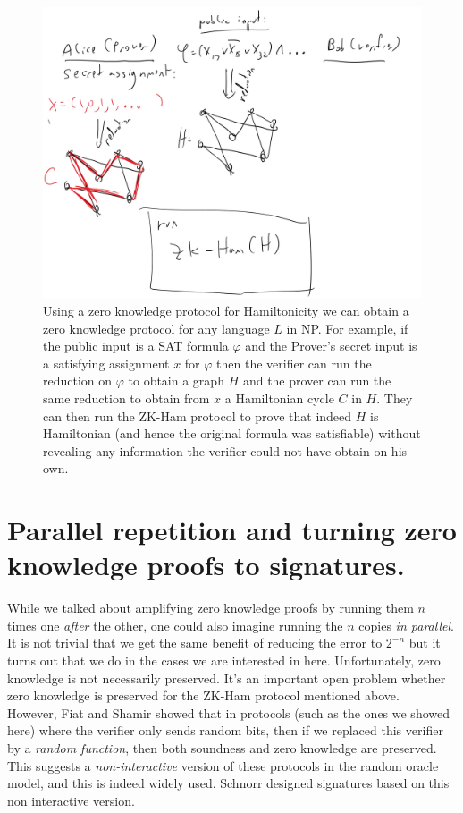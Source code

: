 \begin{figure}
\centering
\includegraphics[width=\textwidth, height=0.25\paperheight, keepaspectratio]{../figure/zk-ham.jpg}
\caption{Using a zero knowledge protocol for Hamiltonicity we can obtain
a zero knowledge protocol for any language \(L\) in NP. For example, if
the public input is a SAT formula \(\varphi\) and the Prover's secret
input is a satisfying assignment \(x\) for \(\varphi\) then the verifier
can run the reduction on \(\varphi\) to obtain a graph \(H\) and the
prover can run the same reduction to obtain from \(x\) a Hamiltonian
cycle \(C\) in \(H\). They can then run the ZK-Ham protocol to prove
that indeed \(H\) is Hamiltonian (and hence the original formula was
satisfiable) without revealing any information the verifier could not
have obtain on his own.}
\label{tmplabelfig}
\end{figure}

\section{Parallel repetition and turning zero knowledge proofs to
signatures.}\label{Parallel-repetition-and-t}

While we talked about amplifying zero knowledge proofs by running them
\(n\) times one \emph{after} the other, one could also imagine running
the \(n\) copies \emph{in parallel}. It is not trivial that we get the
same benefit of reducing the error to \(2^{-n}\) but it turns out that
we do in the cases we are interested in here. Unfortunately, zero
knowledge is not necessarily preserved. It's an important open problem
whether zero knowledge is preserved for the ZK-Ham protocol mentioned
above.\\
However, Fiat and Shamir showed that in protocols (such as the ones we
showed here) where the verifier only sends random bits, then if we
replaced this verifier by a \emph{random function}, then both soundness
and zero knowledge are preserved. This suggests a \emph{non-interactive}
version of these protocols in the random oracle model, and this is
indeed widely used. Schnorr designed signatures based on this non
interactive version.

